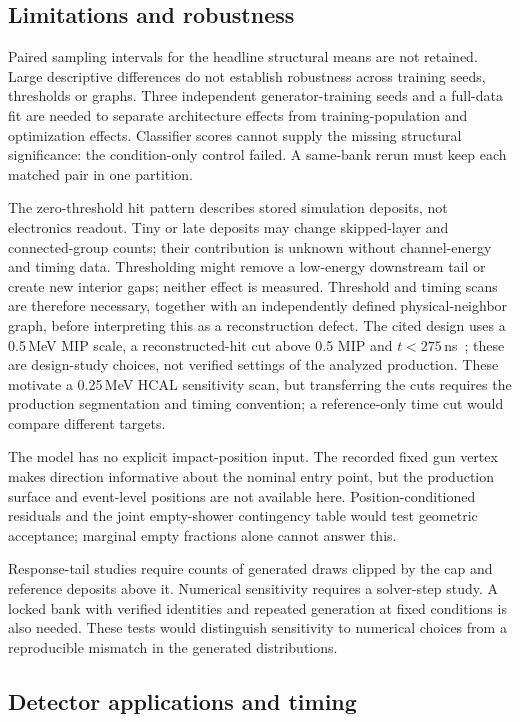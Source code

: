 \documentclass[10pt]{article}
\begin{document}
\subsection{Limitations and robustness}

Paired sampling intervals for the headline structural means are not retained. Large descriptive differences do not establish robustness across training seeds, thresholds or graphs. Three independent generator-training seeds and a full-data fit are needed to separate architecture effects from training-population and optimization effects. Classifier scores cannot supply the missing structural significance: the condition-only control failed. A same-bank rerun must keep each matched pair in one partition.

The zero-threshold hit pattern describes stored simulation deposits, not electronics readout. Tiny or late deposits may change skipped-layer and connected-group counts; their contribution is unknown without channel-energy and timing data. Thresholding might remove a low-energy downstream tail or create new interior gaps; neither effect is measured. Threshold and timing scans are therefore necessary, together with an independently defined physical-neighbor graph, before interpreting this as a reconstruction defect. The cited design uses a 0.5\,MeV MIP scale, a reconstructed-hit cut above 0.5 MIP and $t<275$\,ns~\cite{epiczdc}; these are design-study choices, not verified settings of the analyzed production. These motivate a 0.25\,MeV HCAL sensitivity scan, but transferring the cuts requires the production segmentation and timing convention; a reference-only time cut would compare different targets.

The model has no explicit impact-position input. The recorded fixed gun vertex makes direction informative about the nominal entry point, but the production surface and event-level positions are not available here. Position-conditioned residuals and the joint empty-shower contingency table would test geometric acceptance; marginal empty fractions alone cannot answer this.

Response-tail studies require counts of generated draws clipped by the cap and reference deposits above it. Numerical sensitivity requires a solver-step study. A locked bank with verified identities and repeated generation at fixed conditions is also needed. These tests would distinguish sensitivity to numerical choices from a reproducible mismatch in the generated distributions.

\subsection{Detector applications and timing}
\end{document}
